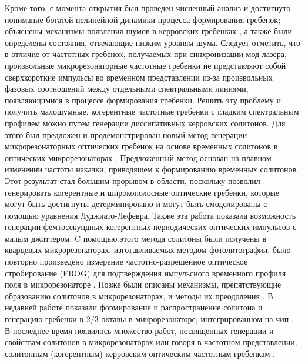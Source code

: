 Кроме того, с момента открытия был проведен численный анализ и достигнуто понимание богатой нелинейной динамики процесса формирования гребенок; объяснены механизмы появления шумов в керровских гребенках \cite{Herr2012}, а также были определены состояния, отвечающие низким уровням шума. Следует отметить, что в отличие от частотных гребенок, получаемых при синхронизации мод лазера, произвольные микрорезонаторные частотные гребенки не представляют собой сверхкороткие импульсы во временном представлении из-за произвольных фазовых соотношений между отдельными спектральными линиями, появляющимися в процессе формирования гребенки. Решить эту проблему и получить малошумные, когерентные частотные гребенки с гладким спектральным профилем можно путем генерации диссипативных керровских солитонов. Для этого был предложен и продемонстрирован новый метод генерации микрорезонаторных оптических гребенок на основе временных солитонов в оптических микрорезонаторах \cite{Herr2014}. Предложенный метод основан на плавном изменении частоты накачки, приводящем к формированию временных солитонов. Этот результат стал большим прорывом в области, поскольку позволил генерировать когерентные и широкополосные оптические гребенки, которые могут быть достигнуты детерминировано и могут быть смоделированы с помощью уравнения Луджиато-Лефевра. Также эта работа показала возможность генерации фемтосекундных когерентных периодических оптических импульсов с малым джиттером. C помощью этого метода солитоны были получены в кварцевых микрорезонаторах, изготавливаемых методом фотолитографии, было повторно произведено измерение частотно-разрешенное оптическое стробирование (FROG) для подтверждения импульсного временного профиля поля в микрорезонаторе \cite{Yi2015}. Позже были описаны механизмы, препятствующие образованию солитонов в микрорезонаторах, и методы их преодоления \cite{HerrPRL2014}. В недавней работе показали формирование и распространение солитона и генерацию гребенки в 2/3 октавы в микрорезонаторе, интегрированном на чип \cite{Brasch2016}.  В последнее время появилось множество работ, посвященных генерации и свойствам солитонов в микрорезонаторах или говоря в частотном представлении, солитонным (когерентным) керровским оптическим частотным гребенкам \cite{Godey2014,Jaramillo2015,Jang2015,Hansson2016,Lamont2013,Saha2013,Matsko2012,DelHaye2014,Wang2014,Bao2014}.


